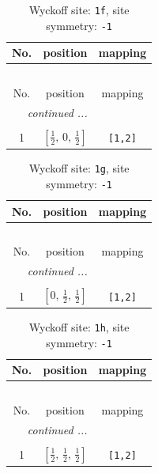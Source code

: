 \documentclass[fleqn,8pt]{jsarticle}
\begin{document}
\renewcommand{\arraystretch}{1.2}
\begin{longtable}{ccc}
\caption{Wyckoff site: {\tt 1f}, site symmetry: {\tt -1}}
 \\
 \hline \hline
No. & position & mapping \\ \hline \endfirsthead

\multicolumn{2}{l}{\tablename\ \thetable{}} \\
 \hline \hline
No. & position & mapping \\ \hline \endhead

 \hline \hline
\multicolumn{2}{r}{\footnotesize\it continued ...} \\ \endfoot

 \hline \hline
\multicolumn{2}{r}{} \\ \endlastfoot

1 & $\left[ \frac{1}{2},\, 0,\, \frac{1}{2} \right]$ & {\tt [1,2]} \\
\end{longtable}
\renewcommand{\arraystretch}{1.2}
\begin{longtable}{ccc}
\caption{Wyckoff site: {\tt 1g}, site symmetry: {\tt -1}}
 \\
 \hline \hline
No. & position & mapping \\ \hline \endfirsthead

\multicolumn{2}{l}{\tablename\ \thetable{}} \\
 \hline \hline
No. & position & mapping \\ \hline \endhead

 \hline \hline
\multicolumn{2}{r}{\footnotesize\it continued ...} \\ \endfoot

 \hline \hline
\multicolumn{2}{r}{} \\ \endlastfoot

1 & $\left[ 0,\, \frac{1}{2},\, \frac{1}{2} \right]$ & {\tt [1,2]} \\
\end{longtable}
\renewcommand{\arraystretch}{1.2}
\begin{longtable}{ccc}
\caption{Wyckoff site: {\tt 1h}, site symmetry: {\tt -1}}
 \\
 \hline \hline
No. & position & mapping \\ \hline \endfirsthead

\multicolumn{2}{l}{\tablename\ \thetable{}} \\
 \hline \hline
No. & position & mapping \\ \hline \endhead

 \hline \hline
\multicolumn{2}{r}{\footnotesize\it continued ...} \\ \endfoot

 \hline \hline
\multicolumn{2}{r}{} \\ \endlastfoot

1 & $\left[ \frac{1}{2},\, \frac{1}{2},\, \frac{1}{2} \right]$ & {\tt [1,2]} \\
\end{longtable}
\end{document}
